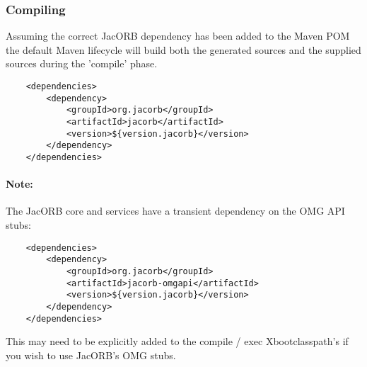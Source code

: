 \subsubsection{Compiling}
Assuming the correct JacORB dependency has been added to the Maven POM the default Maven lifecycle will build both
the generated sources and the supplied sources during the 'compile' phase.
\begin{verbatim}
    <dependencies>
        <dependency>
            <groupId>org.jacorb</groupId>
            <artifactId>jacorb</artifactId>
            <version>${version.jacorb}</version>
        </dependency>
    </dependencies>
\end{verbatim}

\paragraph{Note:}
The JacORB core and services have a transient dependency on the OMG API stubs:

\begin{verbatim}
    <dependencies>
        <dependency>
            <groupId>org.jacorb</groupId>
            <artifactId>jacorb-omgapi</artifactId>
            <version>${version.jacorb}</version>
        </dependency>
    </dependencies>
\end{verbatim}

This may need to be explicitly added to the compile / exec Xbootclasspath's if
you wish to use JacORB's OMG stubs.

